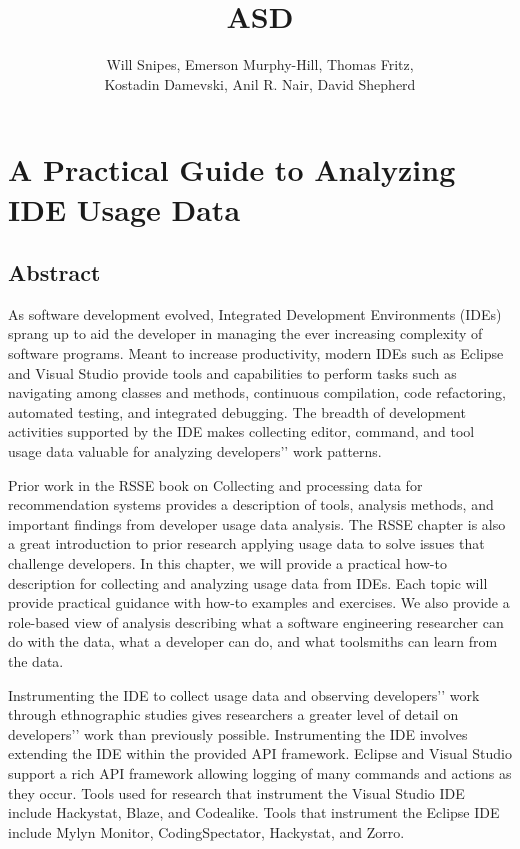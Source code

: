 \documentclass{book}
\begin{document}
\title{ASD}

\chapter{A Practical Guide to Analyzing IDE Usage Data\vspace{-0ex}}
\author{
Will Snipes, Emerson Murphy-Hill,
Thomas Fritz, \\
Kostadin Damevski,
Anil R. Nair, David Shepherd
}
\maketitle
\thispagestyle{empty}
\pagestyle{empty}

\section{Abstract}
As software development evolved, Integrated Development Environments (IDEs) sprang up to aid the developer in managing the ever increasing complexity of software programs.  Meant to increase productivity, modern IDEs such as Eclipse and Visual Studio provide tools and capabilities to perform tasks such as navigating among classes and methods, continuous compilation, code refactoring, automated testing, and integrated debugging.  The breadth of development activities supported by the IDE makes collecting editor, command, and tool usage data valuable for analyzing developers’' work patterns.  

Prior work in the RSSE book on Collecting and processing data for recommendation systems provides a description of tools, analysis methods, and important findings from developer usage data analysis.  The RSSE chapter is also a great introduction to prior research applying usage data to solve issues that challenge developers.  In this chapter, we will provide a practical how-to description for collecting and analyzing usage data from IDEs.  Each topic will provide practical guidance with how-to examples and exercises.  We also provide a role-based view of analysis describing what a software engineering researcher can do with the data, what a developer can do, and what toolsmiths can learn from the data.

Instrumenting the IDE to collect usage data and observing developers’' work through ethnographic studies gives researchers a greater level of detail on developers’' work than previously possible. Instrumenting the IDE involves extending the IDE within the provided API framework.  Eclipse and Visual Studio support a rich API framework allowing logging of many commands and actions  as they occur.  Tools used for research that instrument the Visual Studio IDE include Hackystat\cite{V:johnson2003beyond}, Blaze, and Codealike.  Tools that instrument the Eclipse IDE include Mylyn Monitor, CodingSpectator, Hackystat\cite{V:johnson2003beyond}, and Zorro\cite{Kou2010Operational}.
\end{document}
